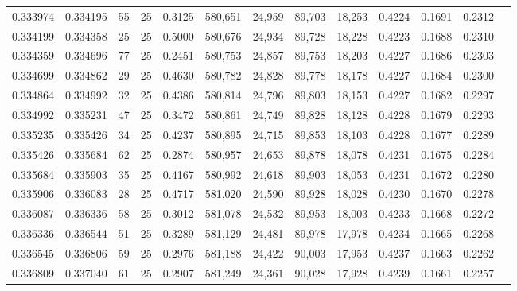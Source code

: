 \begin{tabular}{rrrrrrrrrrrrr}
0.333974 & 0.334195 &    55 &  25 &                                     0.3125 & 580,651 &  24,959 &  89,703 &  18,253 & 0.4224 & 0.1691 & 0.2312 \\
0.334199 & 0.334358 &    25 &  25 &                                     0.5000 & 580,676 &  24,934 &  89,728 &  18,228 & 0.4223 & 0.1688 & 0.2310 \\
0.334359 & 0.334696 &    77 &  25 &                                     0.2451 & 580,753 &  24,857 &  89,753 &  18,203 & 0.4227 & 0.1686 & 0.2303 \\
0.334699 & 0.334862 &    29 &  25 &                                     0.4630 & 580,782 &  24,828 &  89,778 &  18,178 & 0.4227 & 0.1684 & 0.2300 \\
0.334864 & 0.334992 &    32 &  25 &                                     0.4386 & 580,814 &  24,796 &  89,803 &  18,153 & 0.4227 & 0.1682 & 0.2297 \\
0.334992 & 0.335231 &    47 &  25 &                                     0.3472 & 580,861 &  24,749 &  89,828 &  18,128 & 0.4228 & 0.1679 & 0.2293 \\
0.335235 & 0.335426 &    34 &  25 &                                     0.4237 & 580,895 &  24,715 &  89,853 &  18,103 & 0.4228 & 0.1677 & 0.2289 \\
0.335426 & 0.335684 &    62 &  25 &                                     0.2874 & 580,957 &  24,653 &  89,878 &  18,078 & 0.4231 & 0.1675 & 0.2284 \\
0.335684 & 0.335903 &    35 &  25 &                                     0.4167 & 580,992 &  24,618 &  89,903 &  18,053 & 0.4231 & 0.1672 & 0.2280 \\
0.335906 & 0.336083 &    28 &  25 &                                     0.4717 & 581,020 &  24,590 &  89,928 &  18,028 & 0.4230 & 0.1670 & 0.2278 \\
0.336087 & 0.336336 &    58 &  25 &                                     0.3012 & 581,078 &  24,532 &  89,953 &  18,003 & 0.4233 & 0.1668 & 0.2272 \\
0.336336 & 0.336544 &    51 &  25 &                                     0.3289 & 581,129 &  24,481 &  89,978 &  17,978 & 0.4234 & 0.1665 & 0.2268 \\
0.336545 & 0.336806 &    59 &  25 &                                     0.2976 & 581,188 &  24,422 &  90,003 &  17,953 & 0.4237 & 0.1663 & 0.2262 \\
0.336809 & 0.337040 &    61 &  25 &                                     0.2907 & 581,249 &  24,361 &  90,028 &  17,928 & 0.4239 & 0.1661 & 0.2257 \\

\end{tabular}
